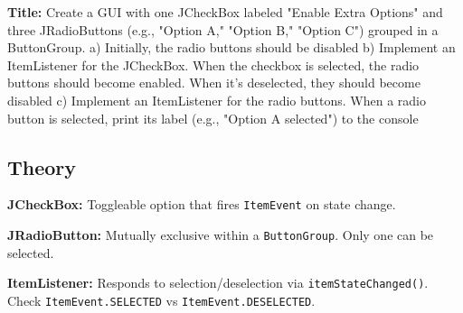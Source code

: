 \documentclass[10pt,a4paper]{article}
\begin{document}
\textbf{Title:} Create a GUI with one JCheckBox labeled "Enable Extra Options" and three JRadioButtons (e.g., "Option A," "Option B," "Option C") grouped in a ButtonGroup. a) Initially, the radio buttons should be disabled b) Implement an ItemListener for the JCheckBox. When the checkbox is selected, the radio buttons should become enabled. When it's deselected, they should become disabled c) Implement an ItemListener for the radio buttons. When a radio button is selected, print its label (e.g., "Option A selected") to the console

\subsection*{Theory}
\textbf{JCheckBox:} Toggleable option that fires \texttt{ItemEvent} on state change.

\textbf{JRadioButton:} Mutually exclusive within a \texttt{ButtonGroup}. Only one can be selected.

\textbf{ItemListener:} Responds to selection/deselection via \texttt{itemStateChanged()}. Check \texttt{ItemEvent.SELECTED} vs \texttt{ItemEvent.DESELECTED}.
\end{document}
